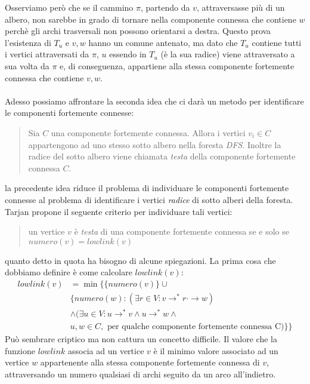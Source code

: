 Osserviamo per\`o che se il cammino $\pi$, partendo da $v$,
attraversasse pi\`u di un albero, non sarebbe in grado di tornare
nella componente connessa che contiene $w$ perch\`e gli archi
trasversali non possono orientarsi a destra. Questo prova l'esistenza
di $T_{u}$ e $v,w$ hanno un comune antenato, ma dato che $T_{u}$
contiene tutti i vertici attraversati da $\pi$, $u$ essendo in $T_{u}$
(\`e la sua radice) viene attraversato a sua volta da $\pi$ e, di
conseguenza, appartiene alla stessa componente fortemente connessa che
contiene $v, w$.
\\\\
Adesso possiamo affrontare la seconda idea che ci dar\`a un metodo per
identificare le componenti fortemente connesse:
\begin{quotation}
  Sia $C$ una componente fortemente connessa. Allora i vertici $v_{i}
  \in C$ appartengono ad uno stesso sotto albero nella foresta
  \emph{DFS}. Inoltre la radice del sotto albero viene chiamata
  \emph{testa} della componente fortemente connessa $C$.
\end{quotation}
la precedente idea riduce il problema di individuare le componenti
fortemente connesse al problema di identificare i vertici
\emph{radice} di sotto alberi della foresta. Tarjan propone il
seguente criterio per individuare tali vertici:
\begin{quotation}
  un vertice $v$ \`e \emph{testa} di una componente fortemente
  connessa se e solo se $numero(v) = lowlink(v)$
\end{quotation}
quanto detto in quota ha bisogno di alcune spiegazioni. La prima cosa
che dobbiamo definire \`e come calcolare $lowlink(v)$:
\begin{displaymath}
  \begin{split}
    lowlink(v) &= \min \{ \{numero(v)\} \cup \\
      & \{numero(w): (\exists r \in V: v \rightarrow^{*} r
      \cdot\rightarrow w) \\
      & \wedge (\exists u \in V: u \rightarrow^{*} v \wedge u
      \rightarrow^{*} w \wedge \\
      & u,w \in C, \text{ per qualche componente fortemente connessa
        C}) \}\}
  \end{split}
\end{displaymath}
Pu\`o sembrare criptico ma non cattura un concetto difficile. Il
valore che la funzione $lowlink$ associa ad un vertice $v$ \`e il
minimo valore associato ad un vertice $w$ appartenente alla stessa
componente fortemente connessa di $v$, attraversando un numero
qualsiasi di archi seguito da un arco all'indietro.

